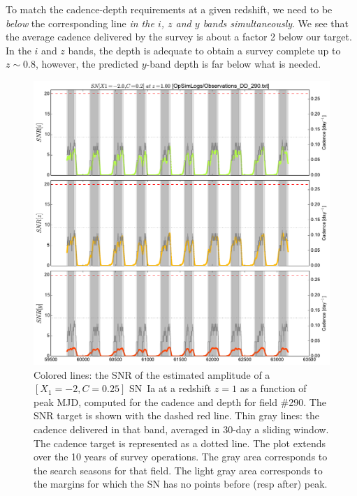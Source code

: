 \documentclass[\docopts]{\docclass}
\begin{document}
To match the cadence-depth requirements at a given redshift, we need
to be {\em below} the corresponding line {\em in the $i$, $z$ and $y$
  bands simultaneously}. We see that the average cadence delivered by
the survey is about a factor 2 below our target. In the $i$ and $z$
bands, the depth is adequate to obtain a survey complete up to $z \sim
0.8$, however, the predicted $y$-band depth is far below what is
needed.


\begin{figure}[t]
  \begin{center}
    \includegraphics[width=\linewidth]{metric_DD_290.pdf}
    \caption{Colored lines: the SNR of the estimated amplitude of a
      $[X_1=-2, C=0.25]$ SN~Ia at a redshift $z = 1$ as a function of
      peak MJD, computed for the  cadence and depth
      for field \#290. The SNR target is shown with the dashed red
      line.  Thin gray lines: the cadence delivered in that band,
      averaged in 30-day a sliding window.  The cadence target is
      represented as a dotted line. The plot extends over the 10 years
      of survey operations. The gray area corresponds to the search
      seasons for that field. The light gray area corresponds to the
      margins for which the SN has no points before (resp after)
      peak.}
    \label{fig:snr_metric}
  \end{center}
\end{figure}
\end{document}
